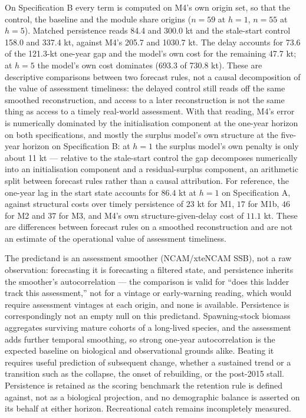 \documentclass[11pt]{article}
\begin{document}
On Specification B every term is computed on M4's own origin set, so
that the control, the baseline and the module share origins (\(n=59\)
at \(h=1\), \(n=55\) at \(h=5\)). Matched persistence reads 84.4 and
300.0 kt and the stale-start control 158.0 and 337.4 kt, against M4's
205.7 and 1030.7 kt. The delay accounts for 73.6 of the 121.3-kt
one-year gap and the model's own cost for the remaining 47.7 kt; at
\(h = 5\) the model's own cost dominates (693.3 of 730.8 kt). These are descriptive comparisons between two
forecast rules, not a causal decomposition of the value of assessment
timeliness: the delayed control still reads off the same smoothed
reconstruction, and access to a later reconstruction is not the same
thing as access to a timely real-world assessment. With that reading,
M4's error is numerically dominated by the initialisation component at the
one-year horizon on both specifications, and mostly the surplus model's own structure at the
five-year horizon on Specification B: at \(h = 1\) the surplus model's
own penalty is only about 11 kt --- relative to the stale-start control the gap decomposes numerically into
an initialisation component and a residual-surplus component, an
arithmetic split between forecast rules rather than a causal
attribution. For reference, the one-year lag in the start state accounts for \(86.4\) kt
at \(h = 1\) on Specification A, against structural costs over timely
persistence of \(23\) kt for M1, \(17\) for M1b, \(46\) for M2 and
\(37\) for M3, and M4's own structure-given-delay cost of \(11.1\) kt.
These are differences between forecast rules on a smoothed
reconstruction and are not an estimate of the operational value of
assessment timeliness.

The predictand is an assessment smoother (NCAM/xteNCAM SSB), not a raw
observation: forecasting it is forecasting a filtered state, and
persistence inherits the smoother's autocorrelation --- the comparison
is valid for ``does this ladder track this assessment,'' not for a
vintage or early-warning reading, which would require assessment
vintages at each origin, and none is available. Persistence is
correspondingly not an empty null on this predictand. Spawning-stock
biomass aggregates surviving mature cohorts of a long-lived species, and
the assessment adds further temporal smoothing, so strong one-year
autocorrelation is the expected baseline on biological and observational
grounds alike. Beating it requires useful prediction of subsequent change, whether a
sustained trend or a transition such as the collapse, the onset of
rebuilding, or the post-2015 stall. Persistence is retained as the scoring benchmark the retention rule is
defined against, not as a biological projection, and no demographic
balance is asserted on its behalf at either horizon.
Recreational catch remains incompletely measured.
\end{document}
